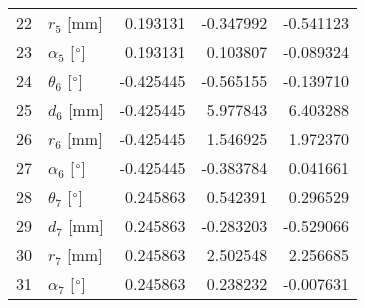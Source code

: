 \documentclass{standalone}%
\begin{document}
\begin{tabular}{llrrr}
22 &              $r_{5}$ [mm] &  0.193131 &  -0.347992 &  -0.541123 \\
23 &  $\alpha_{5}$ [$\degree$] &  0.193131 &   0.103807 &  -0.089324 \\
24 &  $\theta_{6}$ [$\degree$] & -0.425445 &  -0.565155 &  -0.139710 \\
25 &              $d_{6}$ [mm] & -0.425445 &   5.977843 &   6.403288 \\
26 &              $r_{6}$ [mm] & -0.425445 &   1.546925 &   1.972370 \\
27 &  $\alpha_{6}$ [$\degree$] & -0.425445 &  -0.383784 &   0.041661 \\
28 &  $\theta_{7}$ [$\degree$] &  0.245863 &   0.542391 &   0.296529 \\
29 &              $d_{7}$ [mm] &  0.245863 &  -0.283203 &  -0.529066 \\
30 &              $r_{7}$ [mm] &  0.245863 &   2.502548 &   2.256685 \\
31 &  $\alpha_{7}$ [$\degree$] &  0.245863 &   0.238232 &  -0.007631 \\
\bottomrule
\end{tabular}
%
\end{document}
